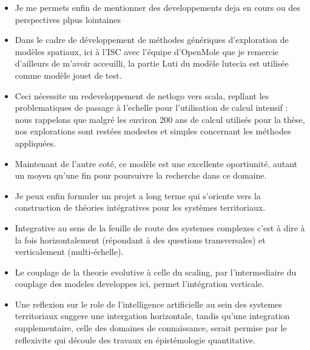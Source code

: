 \documentclass[12pt]{article}
\begin{document}
\begin{itemize}
	\item Je me permets enfin de mentionner des developpements deja en cours ou des perspectives plpus lointaines
	\item Dans le cadre de développement de méthodes génériques d'exploration de modèles spatiaux, ici à l'ISC avec l'équipe d'OpenMole que je remercie d'ailleurs de m'avoir acceuilli, la partie Luti du modèle lutecia est utilisée comme modèle jouet de test. 
	\item Ceci nécessite un redeveloppement de netlogo vers scala, repllant les problematiques de passage à l'echelle pour l'utilisation de calcul intensif : nous rappelons que malgré les environ 200 ans de calcul utilisés pour la thèse, nos explorations sont restées modestes et simples concernant les méthodes appliquées.
	\item Maintenant de l'autre coté, ce modèle est une excellente oportiunité, autant un moyen qu'une fin pour poursuivre la recherche dans ce domaine.
	\item Je peux enfin formuler un projet a long terme qui s'oriente vers la construction de théories intégratives pour les systèmes territoriaux.
	\item Integrative au sens de la feuille de route des systemes complexes c'est à dire à la fois horizontalement (répondant à des questions transversales) et verticalement (multi-échelle).
	\item Le couplage de la theorie evolutive à celle du scaling, par l'intermediaire du couplage des modeles developpes ici, permet l'intégration verticale.
	\item Une reflexion sur le role de l'intelligence artificielle au sein des systemes territoriaux suggere une intergation horizontale, tandis qu'une integration supplementaire, celle des domaines de connaissance, serait permise par le reflexivite qui découle des travaux en épistémologie quantitative.
\end{itemize}
\end{document}
